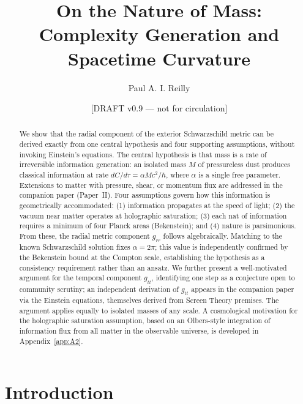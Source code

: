 \documentclass[12pt]{article}
\title{On the Nature of Mass:\\
Complexity Generation and Spacetime Curvature}
\author{Paul A. I. Reilly}
\date{[DRAFT v0.9 --- not for circulation]}
\begin{document}
\maketitle

\begin{abstract}

We show that the radial component of the exterior Schwarzschild metric
can be derived exactly from one central hypothesis and four supporting
assumptions, without invoking Einstein's equations.
The central hypothesis is that mass is a rate of irreversible information
generation: an isolated mass $M$ of pressureless dust produces classical
information at rate $dC/d\tau = \alpha Mc^2/\hbar$, where $\alpha$ is a
single free parameter.
Extensions to matter with pressure, shear, or momentum flux are addressed
in the companion paper (Paper~II).
Four assumptions govern how this information is geometrically accommodated:
(1) information propagates at the speed of light; (2) the vacuum near
matter operates at holographic saturation; (3) each nat of information
requires a minimum of four Planck areas (Bekenstein); and (4) nature is
parsimonious.
From these, the radial metric component $g_{rr}$ follows algebraically.
Matching to the known Schwarzschild solution fixes $\alpha = 2\pi$; this
value is independently confirmed by the Bekenstein bound at the Compton
scale, establishing the hypothesis as a consistency requirement rather
than an ansatz.
We further present a well-motivated argument for the temporal component
$g_{tt}$, identifying one step as a conjecture open to community
scrutiny; an independent derivation of $g_{tt}$ appears in the companion
paper via the Einstein equations, themselves derived from Screen Theory
premises.
The argument applies equally to isolated masses of any scale.
A cosmological motivation for the holographic saturation assumption,
based on an Olbers-style integration of information flux from all matter
in the observable universe, is developed in Appendix~\ref{app:A2}.

\end{abstract}

\section{Introduction}
\end{document}

